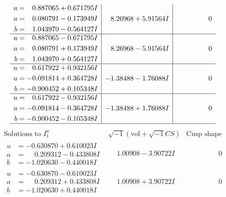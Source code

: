 \documentclass[1p]{elsarticle_modified}
\theoremstyle{definition}
\newcommand{\I}{\sqrt{-1}}
\begin{document}
$$\begin{array}{c|c|c}
\begin{aligned}
u &= \phantom{-}0.887065 + 0.671795 I \\
a &= \phantom{-}0.080791 - 0.173949 I \\
b &= \phantom{-}1.043970 - 0.564127 I\end{aligned}
 & \phantom{-}8.26968 + 5.91564 I & \phantom{-0.000000 } 0 \\ \hline\begin{aligned}
u &= \phantom{-}0.887065 - 0.671795 I \\
a &= \phantom{-}0.080791 + 0.173949 I \\
b &= \phantom{-}1.043970 + 0.564127 I\end{aligned}
 & \phantom{-}8.26968 - 5.91564 I & \phantom{-0.000000 } 0 \\ \hline\begin{aligned}
u &= \phantom{-}0.617922 + 0.932156 I \\
a &= -0.091814 + 0.364728 I \\
b &= -0.900452 + 0.105348 I\end{aligned}
 & -1.38488 - 1.76088 I & \phantom{-0.000000 } 0 \\ \hline\begin{aligned}
u &= \phantom{-}0.617922 - 0.932156 I \\
a &= -0.091814 - 0.364728 I \\
b &= -0.900452 - 0.105348 I\end{aligned}
 & -1.38488 + 1.76088 I & \phantom{-0.000000 } 0\\
 \hline 
 \end{array}$$\newpage$$\begin{array}{c|c|c}  
\text{Solutions to }I^u_{1}& \I (\text{vol} + \sqrt{-1}CS) & \text{Cusp shape}\\
 \hline 
\begin{aligned}
u &= -0.630870 + 0.610023 I \\
a &= \phantom{-}0.209312 - 0.433808 I \\
b &= -1.020630 - 0.440018 I\end{aligned}
 & \phantom{-}1.00908 - 3.90722 I & \phantom{-0.000000 } 0 \\ \hline\begin{aligned}
u &= -0.630870 - 0.610023 I \\
a &= \phantom{-}0.209312 + 0.433808 I \\
b &= -1.020630 + 0.440018 I\end{aligned}
 & \phantom{-}1.00908 + 3.90722 I & \phantom{-0.000000 } 0 \\ \hline\begin{aligned}

\end{aligned}
\end{array}$$
\end{document}
